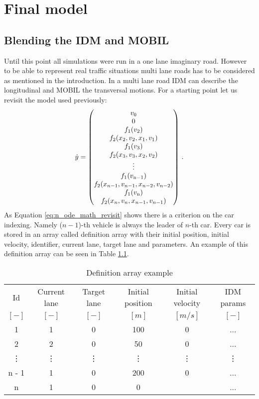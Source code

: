 \chapter{Final model}
	\section{Blending the IDM and MOBIL}
		Until this point all simulations were run in a one lane imaginary road. However to be able to represent real traffic situations multi lane roads has to be considered as mentioned in the introduction. In a multi lane road IDM can describe the longitudinal and MOBIL the transversal motions. For a starting point let us revisit the model used previously:
		\begin{equation}
			\dot{y}=
			\begin{pmatrix}
			v_0\\
			0\\
			f_1(v_{2})\\
			f_2(x_{2}, v_{2},x_{1}, v_{1})\\
			f_1(v_{3})\\
			f_2(x_{3}, v_{3},x_{2}, v_{2})\\
			\vdots\\
			f_1(v_{\rm n-1})\\
			f_2(x_{n-1}, v_{n-1},x_{n-2}, v_{n-2})\\
			f_1(v_{\rm n})\\
			f_2(x_{n}, v_{n},x_{n-1}, v_{n-1})
			\end{pmatrix}\,.
			\label{eq:n_ode_math_revisit}
		\end{equation}
		As Equation \ref{eq:n_ode_math_revisit} shows there is a criterion on the car indexing.  Namely ($n-1$)-th vehicle is always the leader of $n$-th car. Every car is stored in an array called definition array with their initial position, initial velocity, identifier, current lane, target lane and parameters. An example of this definition array can be seen in Table \ref{tab:definition_array}.
		\begin{table}
			\begin{center}
				\begin{tabular}{ |c|c|c|c|c|c| }
					\hline
					Id & Current lane & Target lane & Initial position & Initial velocity& IDM params\\
					$[-]$ & $[-]$ & $[-]$ & $[m]$ & $[m/s]$ & $[-]$\\
					\hline
					1 & 1 & 0 & 100 & 0 & ...\\
					2 & 2 & 0 & 50 & 0 & ...\\
					\vdots & \vdots & \vdots & \vdots & \vdots & \vdots\\
					n - 1 & 1 & 0 & 200 & 0 & ...\\
					n & 1 & 0 & 0 &  & ...\\
					\hline
				\end{tabular}
			\end{center}
			\caption{Definition array example}
			\label{tab:definition_array}
		\end{table}
